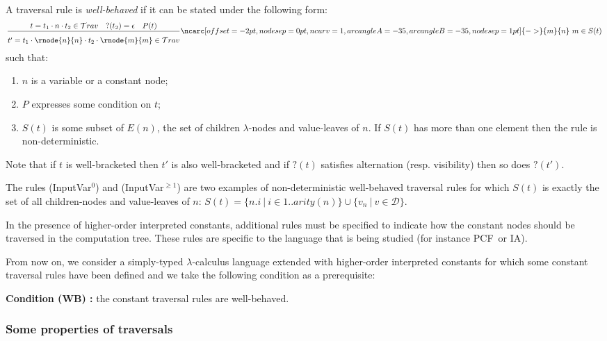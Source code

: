 \documentclass{llncs}
\newcommand\travset{\mathcal{T}rav}
\newcommand\dps{\displaystyle}
\newcommand\rulef[2]{\frac{\dps #1}{#2}}
\newcommand\union{\cup}
\newcommand\ialgol{\textsf{IA}}
\newcommand\pcf{\textsf{PCF}}
\newcommand{\bkptr}[2][nodesep=0pt]{\ncarc[offset=-2pt,nodesep=0pt,ncurv=1,arcangleA=-#2, arcangleB=-#2,#1]{->}}
\begin{document}
\begin{definition}
\label{def:wellbehaved_traversal}
A traversal rule is \emph{well-behaved} if it can be stated under the following form:
$$\rulef{t = t_1\cdot n \cdot t_2 \in \travset \quad ?(t_2) = \epsilon \quad P(t)}
  { \stackrel{  \rule{0pt}{3pt} }{t' = t_1\cdot \rnode{n}{n} \cdot t_2 \cdot \rnode{m}{m} \in \travset} }
   \bkptr[nodesep=1pt]{35}{m}{n}
    \ m\in S(t)
   $$
such that:
\begin{enumerate}
  \item $n$ is a variable or a constant node;
  \item $P$ expresses some condition on $t$;
  \item $S(t)$ is some subset of $E(n)$, the set of children $\lambda$-nodes and value-leaves of $n$.
  If $S(t)$ has more than one element then the rule is non-deterministic.
\end{enumerate}
\end{definition}
Note that if $t$ is well-bracketed then $t'$ is also well-bracketed
and if $?(t)$ satisfies alternation (resp. visibility) then so does $?(t')$.


The rules (InputVar$^0$) and (InputVar$^{\geq1}$) are two examples of
non-deterministic well-behaved traversal rules for which
$S(t)$ is exactly the set of all children-nodes and value-leaves of $n$:
$S(t) = \{ n.i \ |\ i \in 1..arity(n) \} \union  \{ v_n \ | \ v \in \mathcal{D} \} $.


In the presence of higher-order interpreted constants, additional rules must be specified to indicate how
the constant nodes should be traversed in the computation tree. These rules
are specific to the language that is being studied (for instance \pcf\ or \ialgol).

From now on, we consider a simply-typed $\lambda$-calculus language extended with
higher-order interpreted constants for which some constant traversal rules have been defined
and we take the following condition as a prerequisite:
\begin{center}
  \textbf{Condition (WB) :} the constant traversal rules are well-behaved.
\end{center}


\subsubsection{Some properties of traversals}
\end{document}
